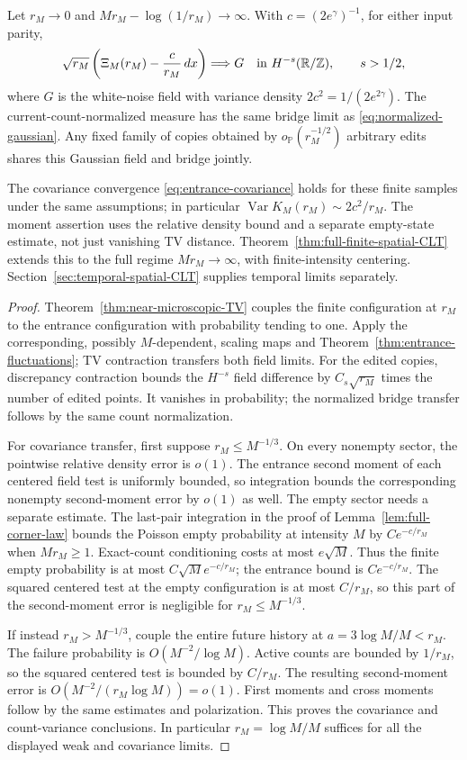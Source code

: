 \documentclass[11pt,letterpaper]{article}
\newcommand{\PP}{\mathbb P}\newcommand{\EE}{\mathbb E}
\newcommand{\T}{\mathbb R/\mathbb Z}\newcommand{\Leb}{\operatorname{Leb}}
\begin{document}
\begin{corollary}
\label{cor:finite-spatial-CLT}
Let $r_M\to0$ and $Mr_M-\log(1/r_M)\to\infty$.
With $c=(2e^\gamma)^{-1}$, for either input parity,
\[
 \sqrt{r_M}\left(\Xi_M(r_M)-\frac c{r_M}\,dx\right)
      \Longrightarrow G
                  \quad\hbox{in }H^{-s}(\T),\qquad s>1/2,
\]
where $G$ is the white-noise field with variance density
$2c^2=1/(2e^{2\gamma})$. The current-count-normalized measure
has the same bridge limit as \eqref{eq:normalized-gaussian}.
Any fixed family of copies obtained by $o_{\PP}(r_M^{-1/2})$
arbitrary edits shares this Gaussian field and bridge jointly.

The covariance convergence \eqref{eq:entrance-covariance} holds
for these finite samples under the same assumptions;
in particular $\operatorname{Var}K_M(r_M)\sim2c^2/r_M$.
The moment assertion uses the relative density bound and a separate
empty-state estimate, not just vanishing TV distance.
Theorem~\ref{thm:full-finite-spatial-CLT} extends this to the full regime
$Mr_M\to\infty$, with finite-intensity centering.
Section~\ref{sec:temporal-spatial-CLT} supplies temporal limits separately.
\end{corollary}
\begin{proof}
Theorem~\ref{thm:near-microscopic-TV} couples the finite configuration
at $r_M$ to the entrance configuration with probability tending
to one. Apply the corresponding, possibly $M$-dependent, scaling
maps and Theorem~\ref{thm:entrance-fluctuations}; TV contraction
transfers both field limits.
For the edited copies, discrepancy contraction bounds the
$H^{-s}$ field difference by $C_s\sqrt{r_M}$ times the number
of edited points. It vanishes in probability; the normalized
bridge transfer follows by the same count normalization.

For covariance transfer, first suppose $r_M\le M^{-1/3}$.
On every nonempty sector, the pointwise relative density error
is $o(1)$. The entrance second moment of each centered field test
is uniformly bounded, so integration bounds the corresponding
nonempty second-moment error by $o(1)$ as well. The empty sector
needs a separate estimate. The last-pair integration in the proof
of Lemma~\ref{lem:full-corner-law} bounds the Poisson empty
probability at intensity $M$ by $Ce^{-c/r_M}$ when $Mr_M\ge1$.
Exact-count conditioning costs at most $e\sqrt M$. Thus the
finite empty probability is at most $C\sqrt M e^{-c/r_M}$;
the entrance bound is $Ce^{-c/r_M}$. The squared centered test
at the empty configuration is at most $C/r_M$, so this part of
the second-moment error is negligible for $r_M\le M^{-1/3}$.

If instead $r_M>M^{-1/3}$, couple the entire future history at
$a=3\log M/M<r_M$. The failure probability is
$O(M^{-2}/\log M)$. Active counts are bounded by $1/r_M$, so
the squared centered test is bounded by $C/r_M$. The resulting
second-moment error is $O(M^{-2}/(r_M\log M))=o(1)$.
First moments and cross moments follow by the same estimates and
polarization. This proves the covariance and count-variance
conclusions. In particular $r_M=\log M/M$ suffices for all the
displayed weak and covariance limits.
\end{proof}
\end{document}

